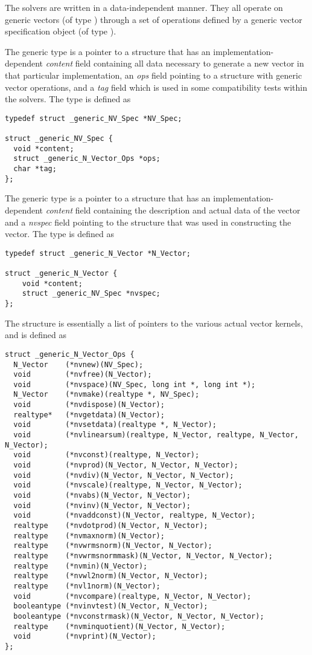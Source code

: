 %
The {\sundials} solvers are written in a data-independent manner. 
They all operate on generic vectors (of type ) through a set of
operations defined by a generic vector specification object (of type ).

The generic  type is a pointer to a structure that has an
implementation-dependent {\em content} field containing
all data necessary to generate a new vector in that particular
implementation, an {\em ops} field pointing to a structure with
generic vector operations, and a {\em tag} field which is used
in some compatibility tests within the {\sundials} solvers. 
The type  is defined as
\begin{verbatim}
typedef struct _generic_NV_Spec *NV_Spec;

struct _generic_NV_Spec {
  void *content;
  struct _generic_N_Vector_Ops *ops;
  char *tag;
};
\end{verbatim}

The generic  type is a pointer to a structure that has an 
implementation-dependent {\em content} field containing the 
description and actual data of the vector and a {\em nvspec} field 
pointing to the  structure that was used in constructing the
vector.
The type  is defined as
\begin{verbatim}
typedef struct _generic_N_Vector *N_Vector;

struct _generic_N_Vector {
    void *content;
    struct _generic_NV_Spec *nvspec;
};
\end{verbatim}

The  structure is essentially a list of pointers to
the various actual vector kernels, and is defined as
\begin{verbatim}
struct _generic_N_Vector_Ops {
  N_Vector    (*nvnew)(NV_Spec);
  void        (*nvfree)(N_Vector);
  void        (*nvspace)(NV_Spec, long int *, long int *);
  N_Vector    (*nvmake)(realtype *, NV_Spec);
  void        (*nvdispose)(N_Vector);
  realtype*   (*nvgetdata)(N_Vector);
  void        (*nvsetdata)(realtype *, N_Vector);
  void        (*nvlinearsum)(realtype, N_Vector, realtype, N_Vector, N_Vector); 
  void        (*nvconst)(realtype, N_Vector);
  void        (*nvprod)(N_Vector, N_Vector, N_Vector);
  void        (*nvdiv)(N_Vector, N_Vector, N_Vector);
  void        (*nvscale)(realtype, N_Vector, N_Vector);
  void        (*nvabs)(N_Vector, N_Vector);
  void        (*nvinv)(N_Vector, N_Vector);
  void        (*nvaddconst)(N_Vector, realtype, N_Vector);
  realtype    (*nvdotprod)(N_Vector, N_Vector);
  realtype    (*nvmaxnorm)(N_Vector);
  realtype    (*nvwrmsnorm)(N_Vector, N_Vector);
  realtype    (*nvwrmsnormmask)(N_Vector, N_Vector, N_Vector);
  realtype    (*nvmin)(N_Vector);
  realtype    (*nvwl2norm)(N_Vector, N_Vector);
  realtype    (*nvl1norm)(N_Vector);
  void        (*nvcompare)(realtype, N_Vector, N_Vector);
  booleantype (*nvinvtest)(N_Vector, N_Vector);
  booleantype (*nvconstrmask)(N_Vector, N_Vector, N_Vector);
  realtype    (*nvminquotient)(N_Vector, N_Vector);
  void        (*nvprint)(N_Vector);
};
\end{verbatim}

